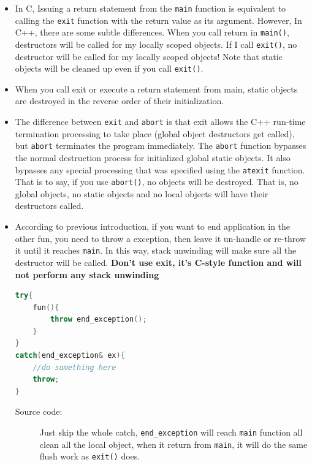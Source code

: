\documentclass[a4paper,11pt,twoside]{book}
\begin{document}
\begin{itemize}
	\item In C, Issuing a return statement from the \texttt{main} function is equivalent to calling the \texttt{exit} function with the return value as its argument. However, In C++, there are some subtle differences. When you call return in \texttt{main()}, destructors will be called for my locally scoped objects. If I call \texttt{exit()}, no destructor will be called for my locally scoped objects! Note that static objects will be cleaned up even if you call \texttt{exit()}. 
	
    \item When you call exit or execute a return statement from main, static objects are destroyed in the reverse order of their initialization.
	
	\item The difference between \texttt{exit} and \texttt{abort} is that exit allows the C++ run-time termination processing to take place (global object destructors get called), but \texttt{abort} terminates the program immediately. The \texttt{abort} function bypasses the normal destruction process for initialized global static objects. It also bypasses any special processing that was specified using the \texttt{atexit} function. That is to say, if you use \texttt{abort()}, no objects will be destroyed. That is, no global objects, no static objects and no local objects will have their destructors called.
	
	\item According to previous introduction, if you want to end application in the other fun, you need to throw a exception, then leave it un-handle or re-throw it until it reaches \texttt{main}. In this way, stack unwinding will make sure all the destructor will be called. \textbf{Don't use exit, it's C-style function and will not perform any stack unwinding}
\begin{lstlisting}[frame=single, language=c++]
try{
	fun(){
		throw end_exception();
	}
}
catch(end_exception& ex){
	//do something here
	throw;
}	
\end{lstlisting}	
	\begin{description}
		\item[Source code:] Just skip the whole catch, \texttt{end\_exception} will reach \texttt{main} function all clean all the local object, when it return from \texttt{main}, it will do the same flush work as \texttt{exit()} does.
	\end{description}
	
\end{itemize}
\end{document}
